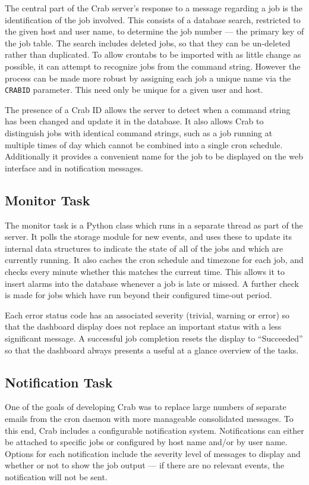 \documentclass[11pt,twoside]{article}
\begin{document}
The central part of the Crab server's response to a message
regarding a job is the identification of the job involved.
This consists of a database search, restricted to the
given host and user name, to determine the job number
--- the primary key of the job table.
The search includes deleted jobs, so that they can
be un-deleted rather than duplicated.
To allow crontabs to be imported with as little change as possible,
it can attempt to recognize jobs from the command string.
However the process can be made more robust by assigning each
job a unique name via the \texttt{CRABID} parameter.
This need only be unique for a given user and host.

The presence of a Crab ID allows the server to detect when a command string
has been changed and update it in the database.
It also allows Crab to distinguish jobs with identical command
strings, such as a job running at multiple times of
day which cannot be combined into a single cron schedule.
Additionally it provides a convenient name for the job
to be displayed on the web interface and in notification messages.

\subsection{Monitor Task}

The monitor task is a Python class which runs in a separate
thread as part of the server.
It polls
the storage module for new events, and
uses
these to update its internal data structures
to indicate
the state of all of the jobs
and which are currently running.
It also caches the cron schedule and timezone for each job,
and checks every minute whether this matches
the current time.
This allows it to insert alarms
into the database
whenever a job is late or missed.
A further check is made for jobs which
have run beyond their
configured time-out period.

Each error status code has an associated severity
(trivial, warning or error)
so that the dashboard display
does not replace an important status with a less significant message.
A successful job completion resets the
display to ``Succeeded'' so that the dashboard
always presents a useful at a glance overview
of the tasks.

\subsection{Notification Task}

One of the goals of developing Crab was to replace
large numbers of separate emails from
the cron daemon with more manageable
consolidated messages.
To this end, Crab includes a
configurable notification system.
Notifications can either be
attached to specific jobs
or configured by host name and/or by user name.
Options for each notification include
the severity level of messages to
display and whether or not to show
the job output
--- if there are no relevant events, the notification
will not be sent.
\end{document}
